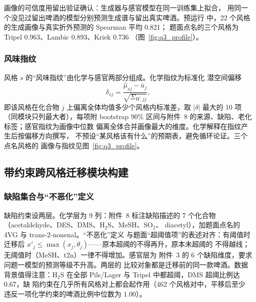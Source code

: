 \documentclass[12pt,a4paper]{article}
\begin{document}
画像的可信度用留出验证确认：生成器与感官模型在同一训练集上拟合，
用同一个没见过留出啤酒的模型分别预测生成谱与留出真实啤酒。预运行
中，22 个风格的生成画像与真实折外预测的 Spearman 平均 0.821；
题面点名的三个风格为 Tripel 0.963、Lambic 0.893、Kriek 0.736
（图~\ref{fig:q3_profile}）。

\subsubsection{风味指纹}

风格 $s$ 的``风味指纹''由化学与感官两部分组成。化学指纹为标准化
潜空间偏移
\begin{equation}
  \delta_{sj}=\frac{\hat\mu_{sj}-\bar u_j}{\sqrt{\Sigma_{W,jj}}},
\end{equation}
即该风格在化合物 $j$ 上偏离全体均值多少个风格内标准差，取
$|\delta|$ 最大的 10 项（同模块只列最大者），每项附 bootstrap
90\% 区间与附件~8 的来源、缺陷、老化标签；感官指纹为画像中位数
偏离全体合并画像最大的维度。化学解释在指纹产生后按偏移方向撰写，
不预设``某风格该有什么''的预期表，避免循环论证。三个点名风格的
画像与指纹见图~\ref{fig:q3_profile}。


\subsection{带约束跨风格迁移模块构建}

\subsubsection{缺陷集合与``不恶化''定义}

缺陷约束设两层。化学层为 9 列：附件~8 标注缺陷描述的
7 个化合物（acetaldehyde、DES、DMS、H$_2$S、MeSH、SO$_2$、
diacetyl），加题面点名的 4VG 与 trans-2-nonenal。``不恶化''定义
与题面``超阈值项''的表述对齐：有阈值时迁移后
$x'_j\le\max(x_j,\theta_j)$——原本超阈的不得再升，原本未超阈的
不得越线；无阈值时（MeSH、t2n）一律不得增加。感官层为
附件~3 的 6 个缺陷维度，要求问题一模型的预测等级不升高。两层的
比较对象都是迁移前的同一款啤酒。数据背景值得注意：H$_2$S 在全部
Pils/Lager 与 Tripel 中都超阈，DMS 超阈比例达 0.67，缺
陷约束在几乎所有风格对上都会起作用（462 个风格对中，平移后至少
违反一项化学约束的啤酒比例中位数为 1.00）。
\end{document}
